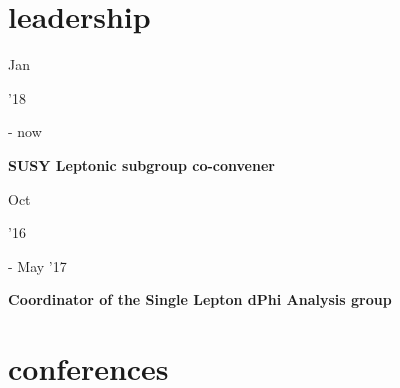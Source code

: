 \documentclass[]{cv} %
\begin{document}
\section{leadership}

\begin{entrylist}

  \entry
  {\parbox[t]{\parboxWidthOne}{Jan}\parbox[t]{\parboxWidthTwo}{\hfill '18} - now}
  {\textbf{SUSY Leptonic subgroup co-convener}}
  {}
  {}

  \entry
  {\parbox[t]{\parboxWidthOne}{Oct}\parbox[t]{\parboxWidthTwo}{\hfill '16} - May '17}
  {\textbf{Coordinator of the Single Lepton dPhi Analysis group}}
  {}
  {}

\end{entrylist}

\section{conferences}
\end{document}
